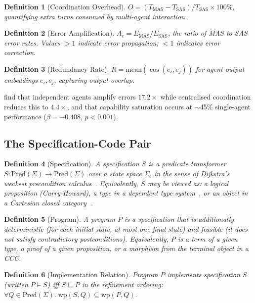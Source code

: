 \documentclass[11pt, a4paper, logo, copyright]{googledeepmind}
\newtheorem{definition}{Definition}[section]
\begin{document}
\begin{definition}[Coordination Overhead]
$O = (T_{\text{MAS}} - T_{\text{SAS}}) / T_{\text{SAS}} \times 100\%$, quantifying extra turns consumed by multi-agent interaction.
\end{definition}

\begin{definition}[Error Amplification]
$A_e = E_{\text{MAS}} / E_{\text{SAS}}$, the ratio of MAS to SAS error rates. Values $> 1$ indicate error propagation; $< 1$ indicates error correction.
\end{definition}

\begin{definition}[Redundancy Rate]
$R = \text{mean}(\cos(e_i, e_j))$ for agent output embeddings $e_i, e_j$, capturing output overlap.
\end{definition}

\citet{kim2025scaling} find that independent agents amplify errors $17.2\times$ while centralised coordination reduces this to $4.4\times$, and that capability saturation occurs at $\sim$45\% single-agent performance ($\beta = -0.408$, $p < 0.001$).


\subsection{The Specification-Code Pair}

\begin{definition}[Specification]
A \emph{specification} $S$ is a predicate transformer $S: \text{Pred}(\Sigma) \to \text{Pred}(\Sigma)$ over a state space $\Sigma$, in the sense of Dijkstra's weakest precondition calculus~\citep{dijkstra1976discipline}. Equivalently, $S$ may be viewed as: a logical proposition (Curry-Howard), a type in a dependent type system~\citep{martinlof1979constructive}, or an object in a Cartesian closed category~\citep{lambek1986higher}.
\end{definition}

\begin{definition}[Program]
A \emph{program} $P$ is a specification that is additionally \emph{deterministic} (for each initial state, at most one final state) and \emph{feasible} (it does not satisfy contradictory postconditions). Equivalently, $P$ is a term of a given type, a proof of a given proposition, or a morphism from the terminal object in a CCC.
\end{definition}

\begin{definition}[Implementation Relation]
Program $P$ \emph{implements} specification $S$ (written $P \models S$) iff $S \sqsubseteq P$ in the refinement ordering: $\forall Q \in \text{Pred}(\Sigma).\; \text{wp}(S, Q) \subseteq \text{wp}(P, Q)$.
\end{definition}
\end{document}

